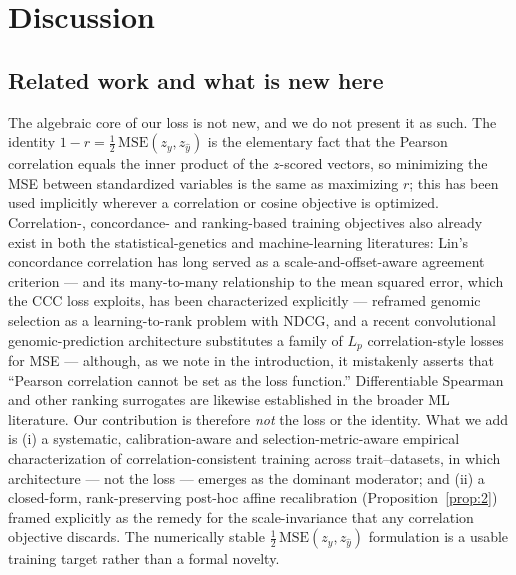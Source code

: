 \section{Discussion}\label{sec:discussion}

\subsection{Related work and what is new here}\label{sec:relatedwork}
The algebraic core of our loss is not new, and we do not present it as such. The
identity $1-r=\tfrac12\,\mathrm{MSE}(z_y,z_{\hat y})$ is the elementary fact that
the Pearson correlation equals the inner product of the $z$-scored vectors, so
minimizing the MSE between standardized variables is the same as maximizing $r$;
this has been used implicitly wherever a correlation or cosine objective is
optimized. Correlation-, concordance- and ranking-based training objectives also
already exist in both the statistical-genetics and machine-learning literatures:
Lin's concordance correlation \citep{lin1989} has long served as a
scale-and-offset-aware agreement criterion --- and its many-to-many relationship
to the mean squared error, which the CCC loss exploits, has been characterized
explicitly \citep{pandit2019} --- \citet{blondel2015} reframed genomic
selection as a learning-to-rank problem with NDCG, and a recent convolutional
genomic-prediction architecture substitutes a family of $L_p$ correlation-style
losses for MSE \citep{pnngs2024} --- although, as we note in the introduction, it
mistakenly asserts that ``Pearson correlation cannot be set as the loss
function.'' Differentiable Spearman and other ranking surrogates are likewise
established in the broader ML literature. Our contribution is therefore
\emph{not} the loss or the identity. What we add is (i) a systematic,
calibration-aware and selection-metric-aware empirical characterization of
correlation-consistent training across  trait--datasets, in which
architecture --- not the loss --- emerges as the dominant moderator; and (ii) a
closed-form, rank-preserving post-hoc affine recalibration
(Proposition~\ref{prop:2}) framed explicitly as the remedy for the
scale-invariance that any correlation objective discards. The numerically stable
$\tfrac12\,\mathrm{MSE}(z_y,z_{\hat y})$ formulation is a usable training target
rather than a formal novelty.

